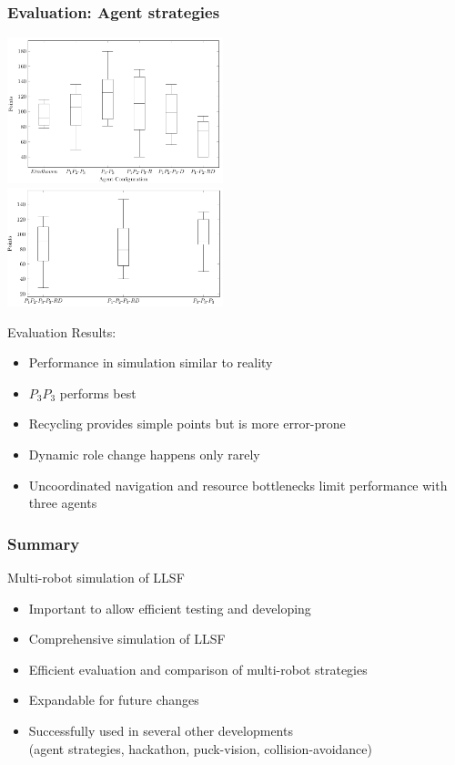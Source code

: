 \documentclass[]{beamer}
\begin{document}
\begin{frame}
  \frametitle{Evaluation: Agent strategies} %
  \begin{multicols}{2}
    \center
    \includegraphics[width=0.47\textwidth]{../pics/eval_two}\\
    \includegraphics[width=0.47\textwidth]{../pics/eval_three}\\
    \raggedright
    Evaluation Results:
    \begin{itemize}
    \item Performance in simulation similar to reality %
    \item $P_3P_3$ performs best %
    \item Recycling provides simple points but is more error-prone
    \item Dynamic role change happens only rarely
    \item Uncoordinated navigation and resource bottlenecks limit performance with three agents
    \end{itemize}
  \end{multicols}
\end{frame}

\begin{frame}
  \frametitle{Summary}
  Multi-robot simulation of LLSF
  \begin{itemize}
  \item Important to allow efficient testing and developing
  \item Comprehensive simulation of LLSF
  \item Efficient evaluation and comparison of multi-robot strategies
  \item Expandable for future changes
  \item Successfully used in several other developments\\(agent strategies, hackathon, puck-vision, collision-avoidance)
  \end{itemize}
\end{frame}
\end{document}
